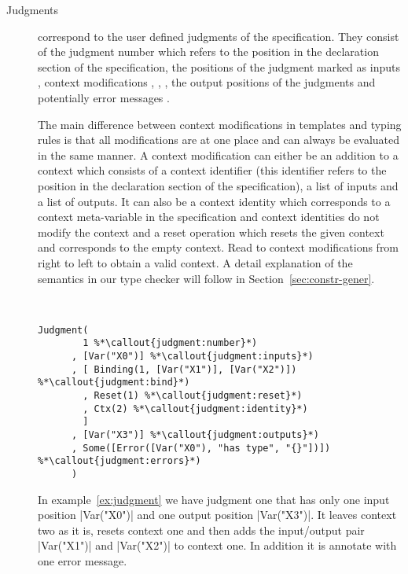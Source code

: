 \begin{description}
\item[Judgments] correspond to the user defined judgments of the
  specification. They consist of the judgment number
   which refers to the position in the
  declaration section of the specification, the positions of the
  judgment marked as inputs , context
  modifications ,
  , , the
  output positions of the judgments  and
  potentially error messages .

  The main difference between context modifications in templates and
  typing rules is that all modifications are at one place and can
  always be evaluated in the same manner. A context modification can
  either be an addition to a context  which
  consists of a context identifier (this identifier refers to the
  position in the declaration section of the specification), a list of
  inputs and a list of outputs. It can also be a context identity
   which corresponds to a context
  meta-variable in the specification and context identities do not
  modify the context and a reset operation 
  which resets the given context and corresponds to the empty
  context. Read to context modifications from right to left to obtain
  a valid context. A detail explanation of the semantics in our type
  checker will follow in Section~\ref{sec:constr-gener}.

\begin{example}{~}
\begin{lstlisting}[language=sltc]
Judgment(
        1 %*\callout{judgment:number}*)
      , [Var("X0")] %*\callout{judgment:inputs}*)
      , [ Binding(1, [Var("X1")], [Var("X2")]) %*\callout{judgment:bind}*)
        , Reset(1) %*\callout{judgment:reset}*)
        , Ctx(2) %*\callout{judgment:identity}*)
        ]
      , [Var("X3")] %*\callout{judgment:outputs}*)
      , Some([Error([Var("X0"), "has type", "{}"])]) %*\callout{judgment:errors}*)
      )
\end{lstlisting}
\label{ex:judgment}
\end{example}

In example~\ref{ex:judgment} we have judgment one that has only one
input position \code|Var("X0")| and one output position
\code|Var("X3")|. It leaves context two as it is, resets context one
and then adds the input/output pair \code|Var("X1")| and
\code|Var("X2")| to context one. In addition it is annotate with one
error message.


\end{description}
